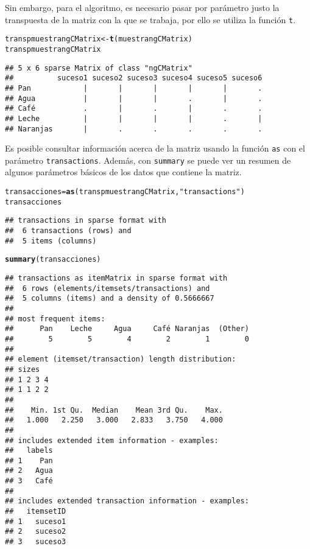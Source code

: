 \documentclass[12pt]{report}\usepackage[]{graphicx}\usepackage[dvipsnames]{xcolor}
\makeatletter
\newcommand{\hlstr}[1]{\textcolor[rgb]{0.192,0.494,0.8}{#1}}%
\newcommand{\hlstd}[1]{\textcolor[rgb]{0.345,0.345,0.345}{#1}}%
\newcommand{\hlkwb}[1]{\textcolor[rgb]{0.69,0.353,0.396}{#1}}%
\newcommand{\hlkwd}[1]{\textcolor[rgb]{0.737,0.353,0.396}{\textbf{#1}}}%
\newenvironment{kframe}{%
 \def\at@end@of@kframe{}%
 \ifinner\ifhmode%
  \def\at@end@of@kframe{\end{minipage}}%
  \begin{minipage}{\columnwidth}%
 \fi\fi%
 \def\FrameCommand##1{\hskip\@totalleftmargin \hskip-\fboxsep
 \colorbox{shadecolor}{##1}\hskip-\fboxsep
     \hskip-\linewidth \hskip-\@totalleftmargin \hskip\columnwidth}%
 \MakeFramed {\advance\hsize-\width
   \@totalleftmargin\z@ \linewidth\hsize
   \@setminipage}}%
 {\par\unskip\endMakeFramed%
 \at@end@of@kframe}
\newenvironment{knitrout}{}{} %
\makeatother
\begin{document}
			Sin embargo, para el algoritmo, es necesario pasar por parámetro justo la transpuesta de la matriz con la que se trabaja, por ello se utiliza la función \texttt{t}.
			
\begin{knitrout}
\color{fgcolor}\begin{kframe}
\begin{alltt}
\hlstd{transpmuestrangCMatrix} \hlkwb{<-} \hlkwd{t}\hlstd{(muestrangCMatrix)}
\hlstd{transpmuestrangCMatrix}
\end{alltt}
\begin{verbatim}
## 5 x 6 sparse Matrix of class "ngCMatrix"
##          suceso1 suceso2 suceso3 suceso4 suceso5 suceso6
## Pan            |       |       |       |       |       .
## Agua           |       |       |       .       |       .
## Café           .       |       .       |       .       .
## Leche          |       |       |       |       .       |
## Naranjas       |       .       .       .       .       .
\end{verbatim}
\end{kframe}
\end{knitrout}
			
			Es posible consultar información acerca de la matriz usando la función \texttt{as} con el parámetro \texttt{transactions}. Además, con \texttt{summary} se puede ver un resumen de algunos parámetros básicos de los datos que contiene la matriz.
			
\begin{knitrout}
\color{fgcolor}\begin{kframe}
\begin{alltt}
\hlstd{transacciones} \hlkwb{=} \hlkwd{as}\hlstd{(transpmuestrangCMatrix,} \hlstr{"transactions"}\hlstd{)}
\hlstd{transacciones}
\end{alltt}
\begin{verbatim}
## transactions in sparse format with
##  6 transactions (rows) and
##  5 items (columns)
\end{verbatim}
\begin{alltt}
\hlkwd{summary}\hlstd{(transacciones)}
\end{alltt}
\begin{verbatim}
## transactions as itemMatrix in sparse format with
##  6 rows (elements/itemsets/transactions) and
##  5 columns (items) and a density of 0.5666667 
## 
## most frequent items:
##      Pan    Leche     Agua     Café Naranjas  (Other) 
##        5        5        4        2        1        0 
## 
## element (itemset/transaction) length distribution:
## sizes
## 1 2 3 4 
## 1 1 2 2 
## 
##    Min. 1st Qu.  Median    Mean 3rd Qu.    Max. 
##   1.000   2.250   3.000   2.833   3.750   4.000 
## 
## includes extended item information - examples:
##   labels
## 1    Pan
## 2   Agua
## 3   Café
## 
## includes extended transaction information - examples:
##   itemsetID
## 1   suceso1
## 2   suceso2
## 3   suceso3
\end{verbatim}
\end{kframe}
\end{knitrout}
			
\end{document}
